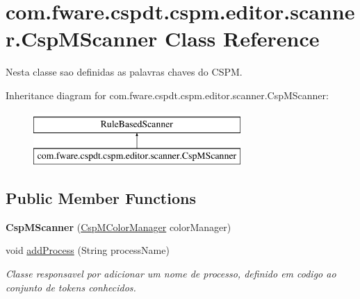 \hypertarget{classcom_1_1fware_1_1cspdt_1_1cspm_1_1editor_1_1scanner_1_1_csp_m_scanner}{}\section{com.\+fware.\+cspdt.\+cspm.\+editor.\+scanner.\+Csp\+M\+Scanner Class Reference}
\label{classcom_1_1fware_1_1cspdt_1_1cspm_1_1editor_1_1scanner_1_1_csp_m_scanner}


Nesta classe sao definidas as palavras chaves do C\+S\+PM.  


Inheritance diagram for com.\+fware.\+cspdt.\+cspm.\+editor.\+scanner.\+Csp\+M\+Scanner\+:\begin{figure}[H]
\begin{center}
\leavevmode
\includegraphics[height=2.000000cm]{classcom_1_1fware_1_1cspdt_1_1cspm_1_1editor_1_1scanner_1_1_csp_m_scanner}
\end{center}
\end{figure}
\subsection*{Public Member Functions}
\begin{DoxyCompactItemize}
\item 
\mbox{\label{classcom_1_1fware_1_1cspdt_1_1cspm_1_1editor_1_1scanner_1_1_csp_m_scanner_a22c6a3b72a8aac91999fc67ea878f562}} 
{\bfseries Csp\+M\+Scanner} (\hyperlink{classcom_1_1fware_1_1cspdt_1_1cspm_1_1editor_1_1config_1_1_csp_m_color_manager}{Csp\+M\+Color\+Manager} color\+Manager)
\item 
void \hyperlink{classcom_1_1fware_1_1cspdt_1_1cspm_1_1editor_1_1scanner_1_1_csp_m_scanner_af76db62b0ad376ba6d53325a76f7a9e7}{add\+Process} (String process\+Name)
\begin{DoxyCompactList}\small\item\em Classe responsavel por adicionar um nome de processo, definido em codigo ao conjunto de tokens conhecidos. \end{DoxyCompactList}\end{DoxyCompactItemize}


